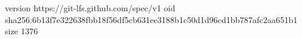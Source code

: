 version https://git-lfs.github.com/spec/v1
oid sha256:6b13f7e322638fbb18f56df5cb631ee3188b1c50d1d96cd1bb787afc2aa651b1
size 1376
